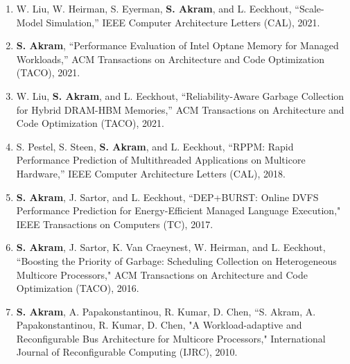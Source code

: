 \documentclass[singlecolumn,singlespace,11pt]{article}
\begin{document}
\begin{enumerate}
\item
W. Liu, W. Heirman, S. Eyerman, \textbf{S. Akram}, and L. Eeckhout, ``Scale-Model Simulation,'' IEEE Computer Architecture Letters (CAL), 2021.
\item
\textbf{S. Akram}, ``Performance Evaluation of Intel Optane Memory for Managed Workloads,'' ACM Transactions on Architecture and Code Optimization (TACO), 2021.
\item
W. Liu, \textbf{S. Akram}, and L. Eeckhout, ``Reliability-Aware Garbage Collection for Hybrid DRAM-HBM Memories,'' ACM Transactions on Architecture and Code Optimization (TACO), 2021.
\item
S. Pestel, S. Steen, \textbf{S. Akram}, and L. Eeckhout, ``RPPM: Rapid Performance Prediction of Multithreaded Applications on Multicore Hardware,'' IEEE Computer Architecture Letters (CAL), 2018.
\item
\textbf{S. Akram}, J. Sartor, and L. Eeckhout, ``DEP+BURST: Online DVFS Performance Prediction for Energy-Efficient Managed Language Execution," IEEE Transactions on Computers (TC), 2017.
\item
\textbf{S. Akram}, J. Sartor, K. Van Craeynest, W. Heirman, and L. Eeckhout, ``Boosting the Priority of Garbage: Scheduling Collection on Heterogeneous Multicore Processors," ACM Transactions on Architecture and Code Optimization (TACO), 2016.
\item
\textbf{S. Akram}, A. Papakonstantinou, R. Kumar, D. Chen, ``S. Akram, A. Papakonstantinou, R. Kumar, D. Chen, "A Workload-adaptive and Reconfigurable Bus Architecture for Multicore Processors," 
International Journal of Reconfigurable Computing (IJRC), 2010.
\end{enumerate}
\end{document}
